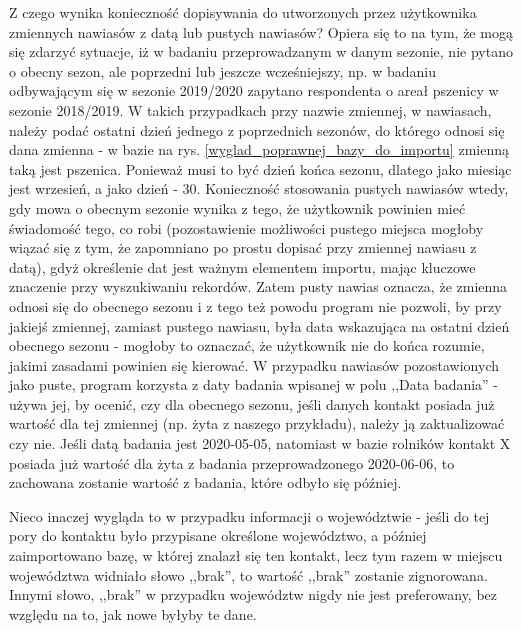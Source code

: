 \documentclass[12pt, twoside, hidelinks]{report}
\begin{document}
Z czego wynika konieczność dopisywania do utworzonych przez użytkownika zmiennych nawiasów z datą lub pustych nawiasów? Opiera się to na tym, że mogą się zdarzyć sytuacje, iż w badaniu przeprowadzanym w danym sezonie, nie pytano o obecny sezon, ale poprzedni lub jeszcze wcześniejszy, np. w badaniu odbywającym się w sezonie 2019/2020 zapytano respondenta o areał pszenicy w sezonie 2018/2019. W takich przypadkach przy nazwie zmiennej, w nawiasach, należy podać ostatni dzień jednego z poprzednich sezonów, do którego odnosi się dana zmienna - w bazie na rys. \ref{wyglad_poprawnej_bazy_do_importu} zmienną taką jest pszenica. Ponieważ musi to być dzień końca sezonu, dlatego jako miesiąc jest wrzesień, a jako dzień - 30. Konieczność stosowania pustych nawiasów wtedy, gdy mowa o obecnym sezonie wynika z tego, że użytkownik powinien mieć świadomość tego, co robi (pozostawienie możliwości pustego miejsca mogłoby wiązać się z tym, że zapomniano po prostu dopisać przy zmiennej nawiasu z datą), gdyż określenie dat jest ważnym elementem importu, mając kluczowe znaczenie przy wyszukiwaniu rekordów. Zatem pusty nawias oznacza, że zmienna odnosi się do obecnego sezonu i z tego też powodu program nie pozwoli, by przy jakiejś zmiennej, zamiast pustego nawiasu, była data wskazująca na ostatni dzień obecnego sezonu - mogłoby to oznaczać, że użytkownik nie do końca rozumie, jakimi zasadami powinien się kierować. W przypadku nawiasów pozostawionych jako puste, program korzysta z daty badania wpisanej w polu ,,Data badania'' - używa jej, by ocenić, czy dla obecnego sezonu, jeśli danych kontakt posiada już wartość dla tej zmiennej (np. żyta z naszego przykładu), należy ją zaktualizować czy nie. Jeśli datą badania jest 2020-05-05, natomiast w bazie rolników kontakt X posiada już wartość dla żyta z badania przeprowadzonego 2020-06-06, to zachowana zostanie wartość z badania, które odbyło się później. \par
Nieco inaczej wygląda to w przypadku informacji o województwie - jeśli do tej pory do kontaktu było przypisane określone województwo, a później zaimportowano bazę, w której znalazł się ten kontakt, lecz tym razem w miejscu województwa widniało słowo ,,brak'', to wartość ,,brak'' zostanie zignorowana. Innymi słowo, ,,brak'' w przypadku województw nigdy nie jest preferowany, bez względu na to, jak nowe byłyby te dane. \par
\end{document}
